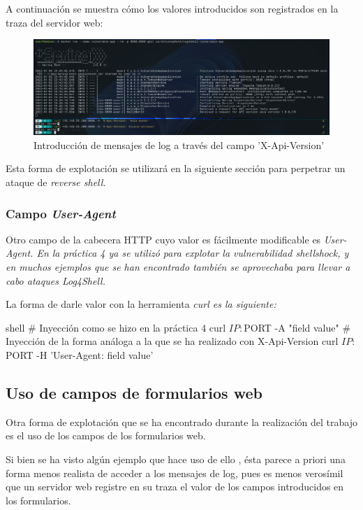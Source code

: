 \documentclass[../main.tex]{subfiles}
\begin{document}
A continuación se muestra cómo los valores introducidos son registrados en la traza del servidor web:
\begin{figure}[!h]
\centering
\includegraphics[width=15.0cm]{imagenes/3-Exploit/log4j-lookup_explained.png}
\caption{Introducción de mensajes de log a través del campo 'X-Api-Version'}
\end{figure}

Esta forma de explotación \cite{exploit-lunasec} se utilizará en la siguiente sección para perpetrar un ataque de \it{reverse shell}.

\subsubsection{Campo \it{User-Agent}}

Otro campo de la cabecera HTTP cuyo valor es fácilmente modificable es \it{User-Agent}. En la práctica 4 ya se utilizó para explotar la vulnerabilidad \it{shellshock}, y en muchos ejemplos que se han encontrado también se aprovechaba para llevar a cabo ataques \it{Log4Shell}.

La forma de darle valor con la herramienta \it{curl} es la siguiente:
\begin{codigo}{shell}
# Inyección como se hizo en la práctica 4
curl ${IP}:${PORT} -A "field value"
# Inyección de la forma análoga a la que se ha realizado con X-Api-Version
curl ${IP}:${PORT} -H 'User-Agent: field value'
\end{codigo}

\subsection{Uso de campos de formularios web}

Otra forma de explotación que se ha encontrado durante la realización del trabajo es el uso de los campos de los formularios web.

Si bien se ha visto algún ejemplo que hace uso de ello \cite{exploit-log4shell-formulario}, ésta parece a priori una forma menos realista de acceder a los mensajes de log, pues es menos verosímil que un servidor web registre en su traza el valor de los campos introducidos en los formularios.
\end{document}

